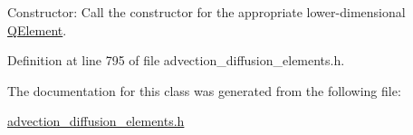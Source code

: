 Constructor\+: Call the constructor for the appropriate lower-\/dimensional \hyperlink{classoomph_1_1QElement}{Q\+Element}. 



Definition at line 795 of file advection\+\_\+diffusion\+\_\+elements.\+h.



The documentation for this class was generated from the following file\+:\begin{DoxyCompactItemize}
\item 
\hyperlink{advection__diffusion__elements_8h}{advection\+\_\+diffusion\+\_\+elements.\+h}\end{DoxyCompactItemize}
